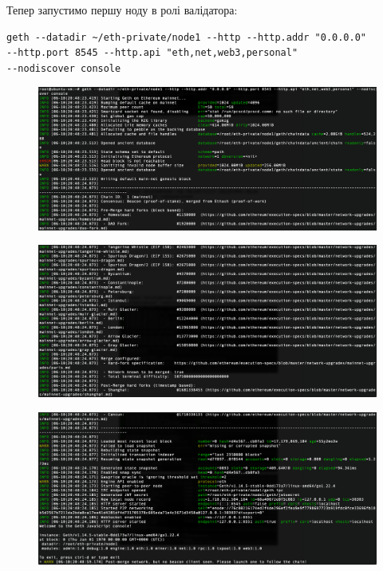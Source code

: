 \newpage
Тепер запустимо першу ноду в ролі валідатора:
\begin{verbatim}
geth --datadir ~/eth-private/node1 --http --http.addr "0.0.0.0" 
--http.port 8545 --http.api "eth,net,web3,personal" 
--nodiscover console
\end{verbatim}

\vspace{-0.45cm}
\begin{figure}[ht]
        \centering
        \includegraphics[scale=0.35]{IMAGES/launch11.png}
        \label{fig_pacman}
\end{figure}
\vspace{-1.35cm}
\begin{figure}[ht]
        \centering
        \includegraphics[scale=0.35]{IMAGES/launch12.png}
        \label{fig_pacman}
\end{figure}
\vspace{-1.35cm}
\begin{figure}[h!]
        \centering
        \includegraphics[scale=0.35]{IMAGES/launch13.png}
        \label{fig_pacman}
\end{figure}

